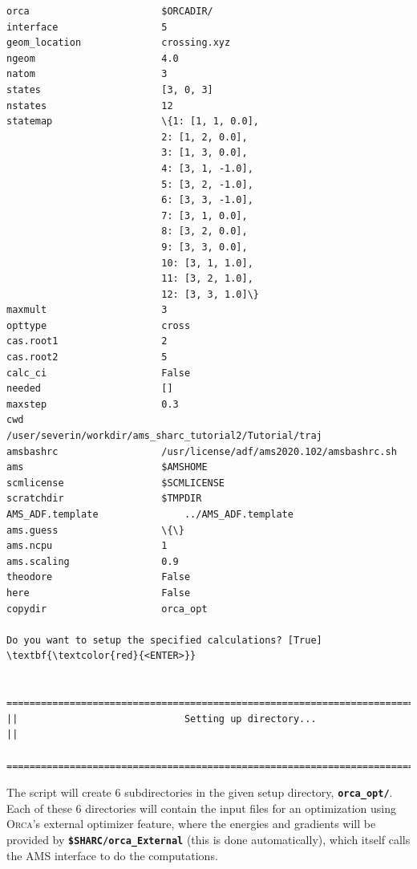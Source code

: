 \documentclass[a4paper,11pt,DIV=15,openany]{scrbook}
\newcommand{\ttt}[1]{\textbf{\texttt{#1}}}
\begin{document}
\begin{oframed}
\begin{Verbatim}[commandchars=\\\{\}]
orca                       $ORCADIR/
interface                  5
geom_location              crossing.xyz
ngeom                      4.0
natom                      3
states                     [3, 0, 3]
nstates                    12
statemap                   \{1: [1, 1, 0.0], 
                           2: [1, 2, 0.0], 
                           3: [1, 3, 0.0], 
                           4: [3, 1, -1.0], 
                           5: [3, 2, -1.0], 
                           6: [3, 3, -1.0], 
                           7: [3, 1, 0.0], 
                           8: [3, 2, 0.0], 
                           9: [3, 3, 0.0], 
                           10: [3, 1, 1.0], 
                           11: [3, 2, 1.0], 
                           12: [3, 3, 1.0]\}
maxmult                    3
opttype                    cross
cas.root1                  2
cas.root2                  5
calc_ci                    False
needed                     []
maxstep                    0.3
cwd                        /user/severin/workdir/ams_sharc_tutorial2/Tutorial/traj
amsbashrc                  /usr/license/adf/ams2020.102/amsbashrc.sh
ams                        $AMSHOME
scmlicense                 $SCMLICENSE
scratchdir                 $TMPDIR
AMS_ADF.template               ../AMS_ADF.template
ams.guess                  \{\}
ams.ncpu                   1
ams.scaling                0.9
theodore                   False
here                       False
copydir                    orca_opt

Do you want to setup the specified calculations? [True] \textbf{\textcolor{red}{<ENTER>}}

  ================================================================================
||                             Setting up directory...                            ||
  ================================================================================
\end{Verbatim}
\end{oframed}

\normalsize
The script will create 6 subdirectories in the given setup directory, \ttt{orca\_opt/}.
Each of these 6 directories will contain the input files for an optimization using \textsc{Orca}'s external optimizer feature, where the energies and gradients will be provided by \ttt{\$SHARC/orca\_External} (this is done automatically), which itself calls the \textsc{AMS} interface to do the computations.
\end{document}
